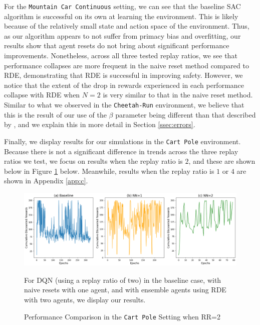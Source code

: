 \documentclass[base]{subfiles}
\begin{document}
For the \texttt{Mountain Car Continuous} setting, we can see that the baseline SAC algorithm is successful on its own at learning the environment.
This is likely because of the relatively small state and action space of the environment.
Thus, as our algorithm appears to not suffer from primacy bias and overfitting, our results show that agent resets do not bring about significant performance improvements. 
Nonetheless, across all three tested replay ratios, we see that performance collapses are more frequent in the naive reset method compared to RDE, demonstrating that RDE is successful in improving safety.
However, we notice that the extent of the drop in rewards experienced in each performance collapse with RDE when $N=2$ is very similar to that in the naive reset method.
Similar to what we observed in the \texttt{Cheetah-Run} environment, we believe that this is the result of our use of the $\beta$ parameter being different than that described by \cite{kim2023}, and we explain this in more detail in Section \ref{ssec:errors}.

Finally, we display results for our simulations in the \texttt{Cart Pole} environment. 
Because there is not a significant difference in trends across the three replay ratios we test, we focus on results when the replay ratio is $2$, and these are shown below in Figure \ref{fig:cp_rr2} below. 
Meanwhile, results when the replay ratio is $1$ or $4$ are shown in Appendix \ref{app:c}.

\begin{figure}[h!]
    \centering
    \caption{Performance Comparison in the \texttt{Cart Pole} Setting when RR=2}
    \label{fig:cp_rr2}
    \includegraphics[width = 1 \linewidth]{cp_RR2.png}
    \begin{flushleft} For DQN (using a replay ratio of two) in the baseline case, with naive resets with one agent, and with ensemble agents using RDE with two agents, we display our results. \end{flushleft}
\end{figure}
\end{document}
